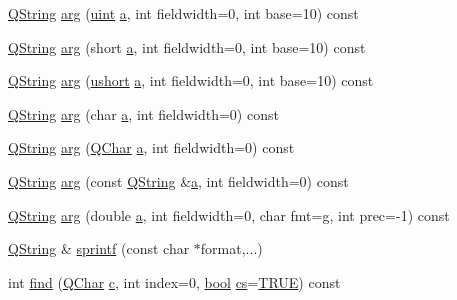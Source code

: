 \begin{DoxyCompactItemize}
\item 
\hyperlink{class_q_string}{Q\+String} \hyperlink{class_q_string_a2c0ac1c043168d5f9bbd3fb523499a15}{arg} (\hyperlink{qglobal_8h_a4d3943ddea65db7163a58e6c7e8df95a}{uint} \hyperlink{060__command__switch_8tcl_ab08ae027fc5777bc4f0629f1b60b35db}{a}, int fieldwidth=0, int base=10) const 
\item 
\hyperlink{class_q_string}{Q\+String} \hyperlink{class_q_string_a3ff80b0df3cb9b24e45993237eb6eeaf}{arg} (short \hyperlink{060__command__switch_8tcl_ab08ae027fc5777bc4f0629f1b60b35db}{a}, int fieldwidth=0, int base=10) const 
\item 
\hyperlink{class_q_string}{Q\+String} \hyperlink{class_q_string_af49a91e755513ed8047806753c1fd6e7}{arg} (\hyperlink{qglobal_8h_ab95f123a6c9bcfee6a343170ef8c5f69}{ushort} \hyperlink{060__command__switch_8tcl_ab08ae027fc5777bc4f0629f1b60b35db}{a}, int fieldwidth=0, int base=10) const 
\item 
\hyperlink{class_q_string}{Q\+String} \hyperlink{class_q_string_a996b4dedff2035b67b2cace77003447e}{arg} (char \hyperlink{060__command__switch_8tcl_ab08ae027fc5777bc4f0629f1b60b35db}{a}, int fieldwidth=0) const 
\item 
\hyperlink{class_q_string}{Q\+String} \hyperlink{class_q_string_aba9bf3d3c71719ce5b422142c77ed212}{arg} (\hyperlink{class_q_char}{Q\+Char} \hyperlink{060__command__switch_8tcl_ab08ae027fc5777bc4f0629f1b60b35db}{a}, int fieldwidth=0) const 
\item 
\hyperlink{class_q_string}{Q\+String} \hyperlink{class_q_string_a4825a0c4f10b22836d5dcc2778343293}{arg} (const \hyperlink{class_q_string}{Q\+String} \&\hyperlink{060__command__switch_8tcl_ab08ae027fc5777bc4f0629f1b60b35db}{a}, int fieldwidth=0) const 
\item 
\hyperlink{class_q_string}{Q\+String} \hyperlink{class_q_string_a179c07adf92f0517e6aff9c326c841e1}{arg} (double \hyperlink{060__command__switch_8tcl_ab08ae027fc5777bc4f0629f1b60b35db}{a}, int fieldwidth=0, char fmt=\textquotesingle{}\hyperlink{060__command__switch_8tcl_af08b4b5bfa9edf0b0a7dee1c2b2c29e0}{g}\textquotesingle{}, int prec=-\/1) const 
\item 
\hyperlink{class_q_string}{Q\+String} \& \hyperlink{class_q_string_a0b6622a8335cdd080e8b1685b7e0fde0}{sprintf} (const char $\ast$format,...)
\item 
int \hyperlink{class_q_string_a0a09b3904653a97a05b3501998215b4a}{find} (\hyperlink{class_q_char}{Q\+Char} \hyperlink{060__command__switch_8tcl_ab14f56bc3bd7680490ece4ad7815465f}{c}, int index=0, \hyperlink{qglobal_8h_a1062901a7428fdd9c7f180f5e01ea056}{bool} \hyperlink{qtextcodec_8cpp_a067a00d3965ca879847daf3c8c224ee6}{cs}=\hyperlink{qglobal_8h_a04a6422a52070f0dc478693da640242b}{T\+R\+U\+E}) const 

\end{DoxyCompactItemize}
